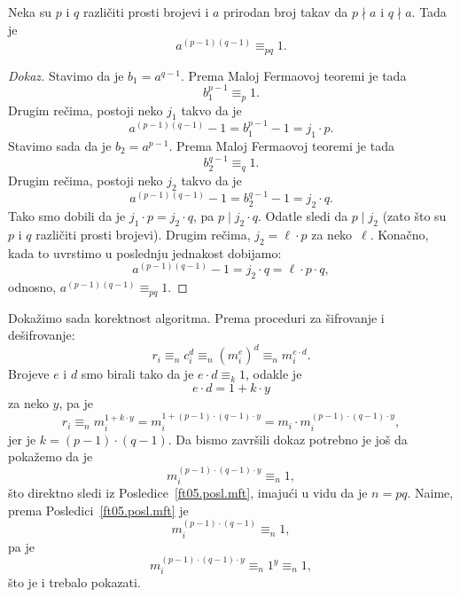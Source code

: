   \begin{COR}\label{ft05.posl.mft}
    Neka su $p$ i $q$ razli\v citi prosti brojevi i $a$ prirodan broj takav da $p \nmid a$ i $q \nmid a$. Tada je
    $$
      a^{(p-1)(q-1)} \equiv_{pq} 1.
    $$
  \end{COR}
  \begin{proof}[Dokaz]
    Stavimo da je $b_1 = a^{q-1}$. Prema Maloj Fermaovoj teoremi je tada
    $$
      b_1^{p-1} \equiv_p 1.
    $$
    Drugim re\v cima, postoji neko $j_1$ takvo da je
    $$
      a^{(p-1)(q-1)} - 1 = b_1^{p-1} - 1 = j_1 \cdot p.
    $$
    Stavimo sada da je $b_2 = a^{p-1}$. Prema Maloj Fermaovoj teoremi je tada
    $$
      b_2^{q-1} \equiv_q 1.
    $$
    Drugim re\v cima, postoji neko $j_2$ takvo da je
    $$
      a^{(p-1)(q-1)} - 1 = b_2^{q-1} - 1 = j_2 \cdot q.
    $$
    Tako smo dobili da je $j_1 \cdot p = j_2 \cdot q$, pa $p \mid j_2 \cdot q$. Odatle sledi da
    $p \mid j_2$ (zato \v sto su $p$ i $q$ razli\v citi prosti brojevi). Drugim re\v cima, $j_2 = \ell \cdot p$ za neko~$\ell$.
    Kona\v cno, kada to uvrstimo u poslednju jednakost dobijamo:
    $$
      a^{(p-1)(q-1)} - 1 = j_2 \cdot q = \ell \cdot p \cdot q,
    $$
    odnosno, $a^{(p-1)(q-1)} \equiv_{pq} 1$.
  \end{proof}
  
  \medskip
  
  Doka\v zimo sada korektnost algoritma.
  Prema proceduri za \v sifrovanje i de\v sifrovanje:
  $$
    r_i \equiv_n c_i^d \equiv_n (m_i^e)^d \equiv_n m_i^{e\cdot d}.
  $$
  Brojeve $e$ i $d$ smo birali tako da je $e\cdot d \equiv_k 1$, odakle je
  $$
    e \cdot d = 1 + k \cdot y
  $$
  za neko $y$, pa je
  $$
    r_i \equiv_n m_i^{1 + k \cdot y} = m_i^{1 + (p-1)\cdot(q-1) \cdot y} = m_i \cdot m_i^{(p-1)\cdot(q-1) \cdot y},
  $$
  jer je $k = (p-1)\cdot(q-1)$. Da bismo zavr\v sili dokaz potrebno je jo\v s da poka\v zemo da je
  $$
    m_i^{(p-1)\cdot(q-1) \cdot y} \equiv_n 1,
  $$
  \v sto direktno sledi iz Posledice~\ref{ft05.posl.mft}, imaju\'ci u vidu da je $n = pq$.
  Naime, prema Posledici~\ref{ft05.posl.mft} je
  $$
    m_i^{(p-1)\cdot(q-1)} \equiv_n 1,
  $$
  pa je
  $$
    m_i^{(p-1)\cdot(q-1) \cdot y} \equiv_n 1^y \equiv_n 1,
  $$
  \v sto je i trebalo pokazati.
  
  \medskip  
  
